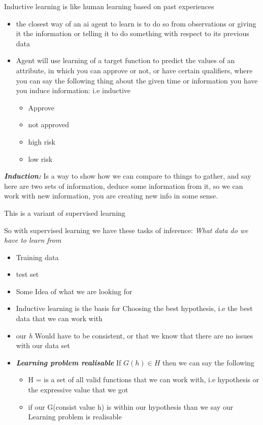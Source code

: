 \documentclass{article}
\theoremstyle{mytheoremstyle}
\theoremstyle{mytheoremstyle}
\theoremstyle{myproblemstyle}
\begin{document}
\begin{definition}
	Inductive learning is like human learning based on past experiences
	\begin{itemize}
		\item the closest way of an ai agent to learn is to do so from observations or giving it the information or telling it to do something with respect to its previous data
		\item Agent will use learning of a target function to predict the values of an attribute, in which you can approve or not, or have certain qualifiers, where you can say the following thing about the given time or information you have you induce information: i.e inductive
		      \begin{itemize}
			      \item Approve
			      \item not approved
			      \item high risk
			      \item low risk
		      \end{itemize}

	\end{itemize}
	\textbf{\textit{Induction:}} Is a way to show how we can compare to things to gather, and say here are two sets of information, deduce some information from it, so we can work with new information, you are creating new info in some sense.

	This is a variant of supervised learning
\end{definition}
So with supervised learning we have these tasks of inference: \textit{What data do we have to learn from }

\begin{itemize}
	\item Training data
	\item test set
	\item Some Idea of what we are looking for
\end{itemize}


\begin{itemize}
	\item Inductive learning is the basis for Choosing the best hypothesis, i.e the best data that we can work with
	\item our \textit{h } Would have to be consistent, or that we know that there are no issues with our data set
	\item \textbf{\textit{Learning problem realisable}} If \( G(h) \in H  \)  then we can say the following
	      \begin{itemize}
		      \item H = is a set of all valid functions that we can work with, i.e hypothesis or the expressive value that we got
		      \item if our G(consist value h) is within our hypothesis than we say our Learning problem is realisable
	      \end{itemize}
\end{itemize}
\end{document}
